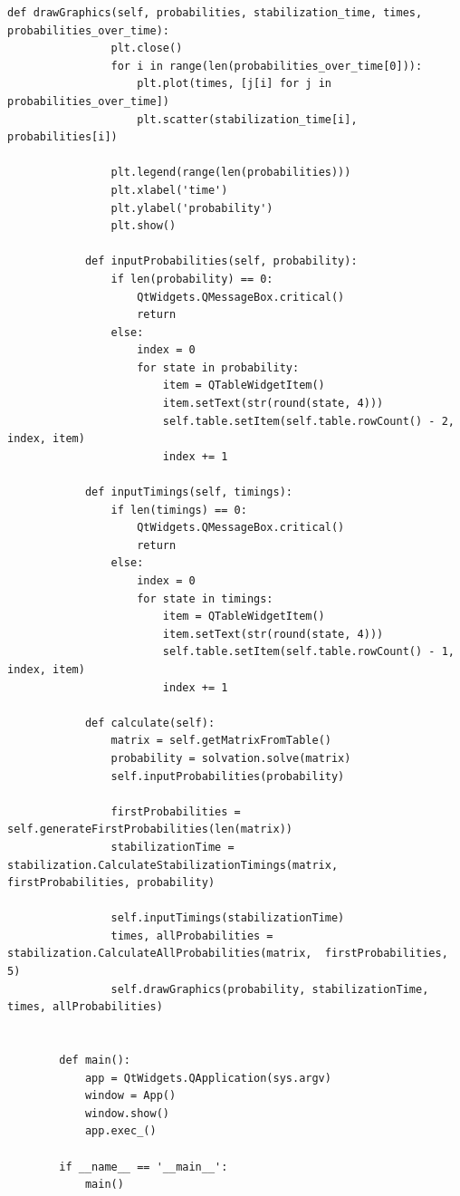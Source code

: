 \documentclass[14pt, a4paper]{extarticle}
\begin{document}
\begin{lstlisting}[caption=main.py]
			def drawGraphics(self, probabilities, stabilization_time, times, probabilities_over_time):
				plt.close()
				for i in range(len(probabilities_over_time[0])):
					plt.plot(times, [j[i] for j in probabilities_over_time])
					plt.scatter(stabilization_time[i], probabilities[i])
				
				plt.legend(range(len(probabilities)))
				plt.xlabel('time')
				plt.ylabel('probability')
				plt.show()
			
			def inputProbabilities(self, probability):
				if len(probability) == 0:
					QtWidgets.QMessageBox.critical()
					return
				else:
					index = 0
					for state in probability:
						item = QTableWidgetItem()
						item.setText(str(round(state, 4)))
						self.table.setItem(self.table.rowCount() - 2, index, item)
						index += 1 
			
			def inputTimings(self, timings):
				if len(timings) == 0:
					QtWidgets.QMessageBox.critical()
					return
				else:
					index = 0
					for state in timings:
						item = QTableWidgetItem()
						item.setText(str(round(state, 4)))
						self.table.setItem(self.table.rowCount() - 1, index, item)
						index += 1 
			
			def calculate(self):
				matrix = self.getMatrixFromTable()
				probability = solvation.solve(matrix)      
				self.inputProbabilities(probability)
					
				firstProbabilities = self.generateFirstProbabilities(len(matrix))
				stabilizationTime = stabilization.CalculateStabilizationTimings(matrix, firstProbabilities, probability) 
			
				self.inputTimings(stabilizationTime)       
				times, allProbabilities = stabilization.CalculateAllProbabilities(matrix,  firstProbabilities, 5)
				self.drawGraphics(probability, stabilizationTime, times, allProbabilities)
				
		
		def main():
			app = QtWidgets.QApplication(sys.argv)
			window = App()
			window.show()
			app.exec_()
		
		if __name__ == '__main__':
			main()
	\end{lstlisting}
\end{document}
